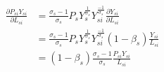 
\begin{equation*}
    \begin{split}
        \frac{\partial P_{si}Y_{si} }{\partial L_{si}}  & = 
        \frac{\sigma_s-1}{\sigma_s}P_s{Y}_s^{\frac{1}{\sigma_s}}Y_{si}^{\frac{-1}{\sigma_s}}\frac{\partial Y_{si}}{\partial L_{si}}\\
        & = \frac{\sigma_s-1}{\sigma_s}P_s{Y}_s^{\frac{1}{\sigma_s}}Y_{si}^{\frac{-1}{\sigma_s}} (1-\beta_s) \frac{Y_{si}}{L_{si}}\\
        &= (1-\beta_s) \frac{\sigma_s-1}{\sigma_s} \frac{P_{si}Y_{si}}{L_{si}}
    \end{split}
\end{equation*}